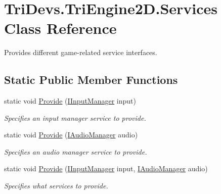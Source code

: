 \hypertarget{class_tri_devs_1_1_tri_engine2_d_1_1_services}{\section{Tri\-Devs.\-Tri\-Engine2\-D.\-Services Class Reference}
\label{class_tri_devs_1_1_tri_engine2_d_1_1_services}
}


Provides different game-\/related service interfaces.  


\subsection*{Static Public Member Functions}
\begin{DoxyCompactItemize}
\item 
static void \hyperlink{class_tri_devs_1_1_tri_engine2_d_1_1_services_a00f67457bccbe0ac69e969dc65181773}{Provide} (\hyperlink{interface_tri_devs_1_1_tri_engine2_d_1_1_input_1_1_i_input_manager}{I\-Input\-Manager} input)
\begin{DoxyCompactList}\small\item\em Specifies an input manager service to provide. \end{DoxyCompactList}\item 
static void \hyperlink{class_tri_devs_1_1_tri_engine2_d_1_1_services_a39e5b16dec05faf57ec293636155f870}{Provide} (\hyperlink{interface_tri_devs_1_1_tri_engine2_d_1_1_audio_1_1_i_audio_manager}{I\-Audio\-Manager} audio)
\begin{DoxyCompactList}\small\item\em Specifies an audio manager service to provide. \end{DoxyCompactList}\item 
static void \hyperlink{class_tri_devs_1_1_tri_engine2_d_1_1_services_af6ea918bb4ac232ace0301f36acd6cc8}{Provide} (\hyperlink{interface_tri_devs_1_1_tri_engine2_d_1_1_input_1_1_i_input_manager}{I\-Input\-Manager} input, \hyperlink{interface_tri_devs_1_1_tri_engine2_d_1_1_audio_1_1_i_audio_manager}{I\-Audio\-Manager} audio)
\begin{DoxyCompactList}\small\item\em Specifies what services to provide. \end{DoxyCompactList}\end{DoxyCompactItemize}
